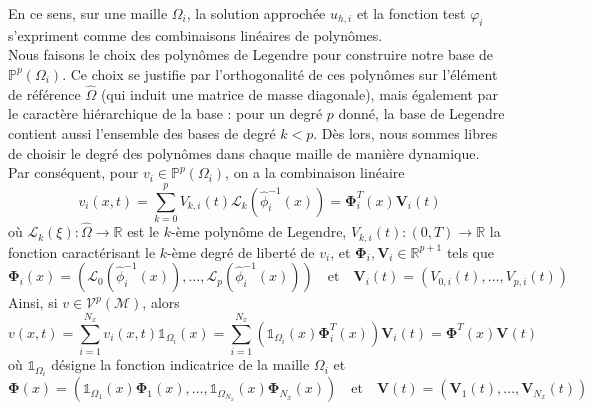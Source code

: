 \documentclass[11pt, a4paper, oneside]{report}
\begin{document}
En ce sens, sur une maille $\Omega_i$, la solution approchée $u_{h, i}$ et la fonction test $\varphi_i$ s'expriment comme des combinaisons linéaires de polynômes. \\
Nous faisons le choix des polynômes de Legendre pour construire notre base de $\mathbb{P}^p(\Omega_i)$. Ce choix se justifie par l'orthogonalité de ces polynômes sur l'élément de référence $\widehat{\Omega}$ (qui induit une matrice de masse diagonale), mais également par le caractère hiérarchique de la base : pour un degré $p$ donné, la base de Legendre contient aussi l'ensemble des bases de degré $k < p$. Dès lors, nous sommes libres de choisir le degré des polynômes dans chaque maille de manière dynamique. \\
Par conséquent, pour $v_i \in \mathbb{P}^p(\Omega_i)$, on a la combinaison linéaire
\begin{equation} \label{eq:Projection_locale}
    v_i(x, t) = \sum_{k = 0}^p V_{k, i}(t) \mathcal{L}_k(\widehat{\phi}_i^{-1}(x)) = \bm{\Phi}_i^T(x)\bm{V}_i(t)
\end{equation}
où $\mathcal{L}_k(\xi) : \widehat{\Omega} \longrightarrow \mathbb{R}$ est le $k$-ème polynôme de Legendre, $V_{k, i}(t) : (0, T) \longrightarrow \mathbb{R}$ la fonction caractérisant le $k$-ème degré de liberté de $v_i$, et $\bm{\Phi}_i, \bm{V}_i \in \mathbb{R}^{p+1}$ tels que
\begin{equation}
     \bm{\Phi}_i(x) = (\mathcal{L}_0(\widehat{\phi}_i^{-1}(x)), \dots, \mathcal{L}_p(\widehat{\phi}_i^{-1}(x))) \quad \text{et} \quad \bm{V}_i(t) = (V_{0, i}(t), \dots,  V_{p, i}(t))
\end{equation}
Ainsi, si $v \in \mathcal{V}^p(\mathcal{M})$, alors
\begin{equation} \label{eq:Projection_globale}
    v(x, t) = \sum_{i = 1}^{N_x} v_i(x, t) \mathds{1}_{\Omega_i}(x) = \sum_{i = 1}^{N_x} \left( \mathds{1}_{\Omega_i}(x) \bm{\Phi}_i^T(x) \right) \bm{V}_i(t) = \bm{\Phi}^T(x) \bm{V}(t)
\end{equation}
où $\mathds{1}_{\Omega_i}$ désigne la fonction indicatrice de la maille $\Omega_i$ et
\begin{equation}
    \bm{\Phi}(x) = (\mathds{1}_{\Omega_1}(x) \bm{\Phi}_1(x), \dots, \mathds{1}_{\Omega_{N_x}}(x) \bm{\Phi}_{N_x}(x)) \quad \text{et} \quad \bm{V}(t) = (\bm{V}_1(t), \dots, \bm{V}_{N_x}(t))
\end{equation}
\end{document}
